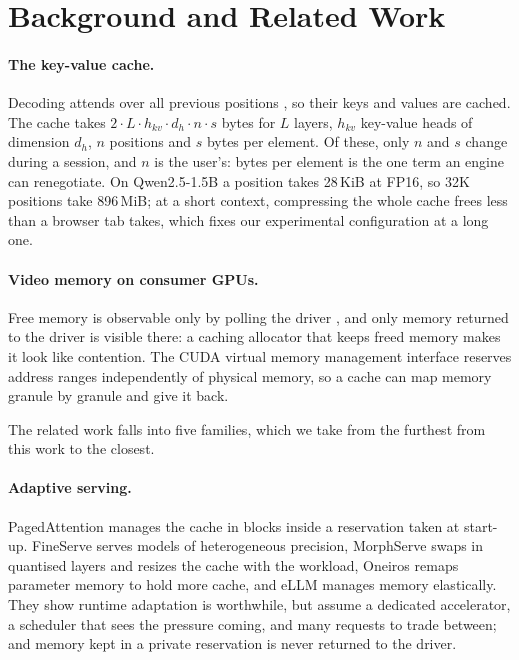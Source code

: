 \documentclass{article}
\begin{document}
\section{Background and Related Work}
\label{sec:related}

\paragraph{The key-value cache.} Decoding attends over all previous positions
\citep{vaswani2017attention}, so their keys and values are cached. The cache
takes $2 \cdot L \cdot h_{kv} \cdot d_h \cdot n \cdot s$ bytes for $L$ layers,
$h_{kv}$ key-value heads of dimension $d_h$, $n$ positions and $s$ bytes per
element. Of these, only $n$ and $s$ change during a session, and $n$ is the
user's: bytes per element is the one term an engine can renegotiate. On
Qwen2.5-1.5B a position takes 28\,KiB at FP16, so 32K positions take 896\,MiB;
at a short context, compressing the whole cache frees less than a browser tab
takes, which fixes our experimental configuration at a long one.

\paragraph{Video memory on consumer GPUs.} Free memory is observable only by
polling the driver \citep{nvml}, and only memory returned to the driver is
visible there: a caching allocator that keeps freed memory makes it look like
contention. The CUDA virtual memory management interface \citep{cudavmm}
reserves address ranges independently of physical memory, so a cache can map
memory granule by granule and give it back.

The related work falls into five families, which we take from the furthest from
this work to the closest.

\paragraph{Adaptive serving.} PagedAttention \citep{kwon2023pagedattention}
manages the cache in blocks inside a reservation taken at start-up. FineServe
\citep{fineserve} serves models of heterogeneous precision, MorphServe
\citep{morphserve} swaps in quantised layers and resizes the cache with the
workload, Oneiros \citep{mirage} remaps parameter memory to hold more cache,
and eLLM \citep{ellm} manages memory elastically. They show runtime adaptation
is worthwhile, but assume a dedicated accelerator, a scheduler that sees the
pressure coming, and many requests to trade between; and memory kept in a
private reservation is never returned to the driver.
\end{document}

